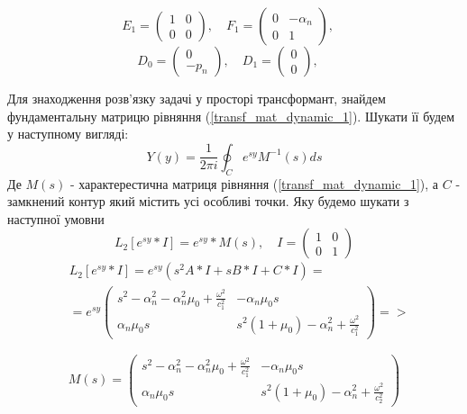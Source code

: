 \begin{equation*}
    E_1 = \begin{pmatrix}
        1 & 0 \\
        0 & 0
    \end{pmatrix}, \quad
    F_1 = \begin{pmatrix}
        0 & -\alpha_n \\
        0 & 1
    \end{pmatrix}, \quad
\end{equation*}
\begin{equation*}
    D_0 = \begin{pmatrix}
        0 \\
        -p_n
    \end{pmatrix}, \quad
    D_1 = \begin{pmatrix}
        0 \\
        0
    \end{pmatrix}, \quad
\end{equation*}

Для знаходження розв'язку задачі у просторі трансформант, знайдем фундаментальну матрицю рівняння (\ref{transf_mat_dynamic_1}).
Шукати її будем у наступному вигляді:
\begin{equation}
    Y(y) = \frac{1}{2\pi i} \oint_C e^{sy} M^{-1}(s)ds
\end{equation}
Де $M(s)$ - характерестична матриця рівняння (\ref{transf_mat_dynamic_1}), а $C$ - замкнений контур який містить усі особливі точки. Яку будемо шукати з наступної умовни
\begin{equation}
    L_2\left[ e^{sy}*I \right] = e^{sy} * M(s), \quad I = \begin{pmatrix} 1 & 0 \\ 0 & 1 \end{pmatrix}
\end{equation}
\begin{align*}
    &L_2\left[ e^{sy}*I \right] = e^{sy} \left( s^2A * I + s B*I + C*I \right) = \\
    &=e^{sy} \begin{pmatrix}
        s^2 - \alpha_n^2 - \alpha_n^2\mu_0 + \frac{\omega^2}{c_1^2} & -\alpha_n \mu_0 s \\
        \alpha_n \mu_0 s & s^2 (1 + \mu_0) -\alpha_n^2 + \frac{\omega^2}{c_1^2}
     \end{pmatrix} =>
\end{align*}

\begin{equation}
    M(s) = \begin{pmatrix}
        s^2 - \alpha_n^2 - \alpha_n^2\mu_0 + \frac{\omega^2}{c_1^2} & -\alpha_n \mu_0 s \\
        \alpha_n \mu_0 s & s^2 (1 + \mu_0) -\alpha_n^2 + \frac{\omega^2}{c_2^2}
     \end{pmatrix}
\end{equation}

